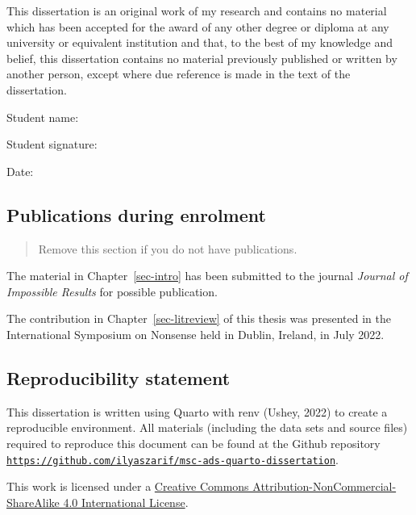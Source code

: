 \documentclass{uniexeterthesis}
\begin{document}

This dissertation is an original work of my research and contains no material
which has been accepted for the award of any other degree or diploma at
any university or equivalent institution and that, to the best of my
knowledge and belief, this dissertation contains no material previously
published or written by another person, except where due reference is
made in the text of the dissertation.

Student name:

Student signature:

Date:

\hypertarget{publications-during-enrolment}{%
\subsection*{Publications during
enrolment}\label{publications-during-enrolment}}

\begin{quote}
Remove this section if you do not have publications.
\end{quote}

The material in Chapter~\ref{sec-intro} has been submitted to the
journal \emph{Journal of Impossible Results} for possible publication.

The contribution in Chapter~\ref{sec-litreview} of this thesis was
presented in the International Symposium on Nonsense held in Dublin,
Ireland, in July 2022.

\hypertarget{reproducibility-statement}{%
\subsection*{Reproducibility
statement}\label{reproducibility-statement}}

This dissertation is written using Quarto with renv (Ushey, 2022) to create a
reproducible environment. All materials (including the data sets and
source files) required to reproduce this document can be found at the
Github repository
\href{https://github.com/ilyaszarif/msc-ads-quarto-dissertation}{\texttt{https://github.com/ilyaszarif/msc-ads-quarto-dissertation}}.

This work is licensed under a
\href{http://creativecommons.org/licenses/by-nc-sa/4.0/}{Creative
Commons Attribution-NonCommercial-ShareAlike 4.0 International License}.
\end{document}
